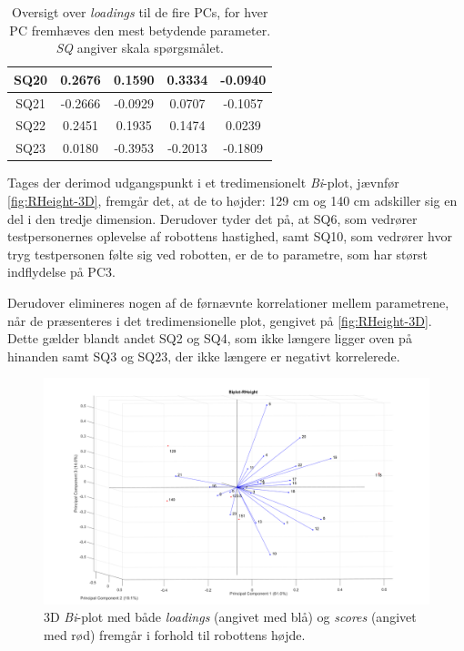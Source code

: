 \begin{table}[H]
\begin{tabular}{c|c|c|c|c}
SQ20 & 0.2676          & 0.1590          & 0.3334          & -0.0940         \\ \hline
SQ21 & -0.2666         & -0.0929         & 0.0707          & -0.1057         \\ \hline
SQ22 & 0.2451          & 0.1935          & 0.1474          & 0.0239          \\ \hline
SQ23 & 0.0180           & -0.3953        & -0.2013         & -0.1809        
\end{tabular}
\caption{Oversigt over \textit{loadings} til de fire PCs, for hver PC fremhæves den mest betydende parameter. \textit{SQ} angiver skala spørgsmålet.}
\label{tab:LoadingsHoejde}
\end{table}
\noindent
%
Tages der derimod udgangspunkt i et tredimensionelt \textit{Bi}-plot, jævnfør \autoref{fig:RHeight-3D}, fremgår det, at de to højder: 129 cm og 140 cm adskiller sig en del i den tredje dimension. Derudover tyder det på, at SQ6, som vedrører testpersonernes oplevelse af robottens hastighed, samt SQ10, som vedrører hvor tryg testpersonen følte sig ved robotten, er de to parametre, som har størst indflydelse på PC3. 

Derudover elimineres nogen af de førnævnte korrelationer mellem parametrene, når de præsenteres i det tredimensionelle plot, gengivet på \autoref{fig:RHeight-3D}. Dette gælder blandt andet SQ2 og SQ4, som ikke længere ligger oven på hinanden samt SQ3 og SQ23, der ikke længere er negativt korrelerede.   
%
\begin{figure}[H]
\centering
\includegraphics[width=\textwidth]{Figure/DatabehandlingSkalaer/PCAfigures/RHeight-3D.png}
\caption{3D \textit{Bi}-plot med både \textit{loadings} (angivet med blå) og \textit{scores} (angivet med rød) fremgår i forhold til robottens højde.}
\label{fig:RHeight-3D}
\end{figure}
%

